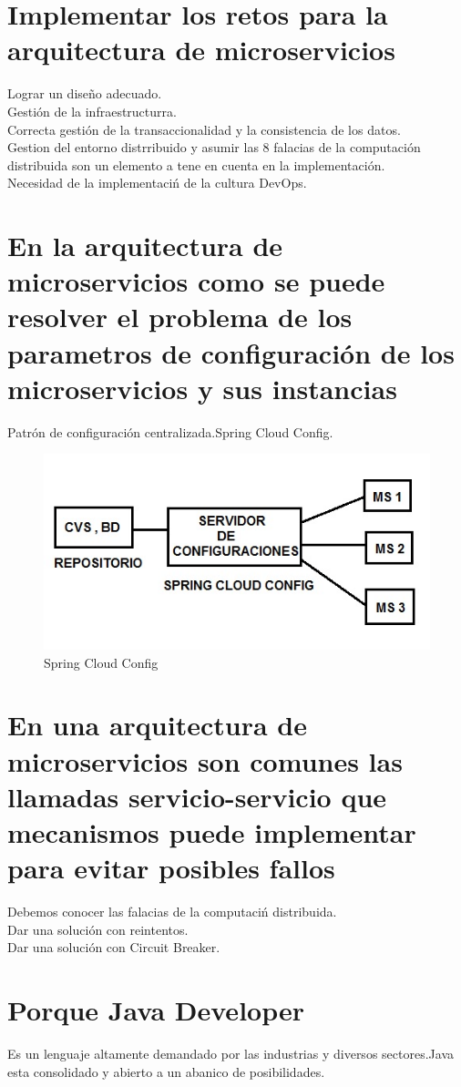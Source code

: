 \section{Implementar los retos para la arquitectura de microservicios}
Lograr un dise\~no adecuado.\\
Gesti\'on de la infraestructurra.\\
Correcta gesti\'on de la transaccionalidad y la consistencia de los datos.\\
Gestion del entorno distrribuido y asumir las 8 falacias de la computaci\'on distribuida son un elemento a tene en cuenta
en la implementaci\'on.\\
Necesidad de la implementaci\'n de la cultura DevOps.
\section{En la arquitectura de microservicios como se puede resolver el problema de los parametros
 de configuraci\'on de los microservicios y sus instancias}
Patr\'on de configuraci\'on centralizada.Spring Cloud Config.
\begin{figure}[H]
	\centering
	\includegraphics[scale=0.7]{images/fig_1_1.jpg}
	\caption{Spring Cloud Config}
\end{figure}
\section{En una arquitectura de microservicios son comunes las llamadas servicio-servicio que mecanismos
	puede implementar para evitar posibles fallos}
Debemos conocer las falacias de la computaci\'n distribuida.\\
Dar una soluci\'on con reintentos.\\
Dar una soluci\'on con Circuit Breaker.
 \section{Porque Java Developer}
 Es un lenguaje altamente demandado por las industrias y diversos sectores.Java esta consolidado y abierto a un abanico de posibilidades.
